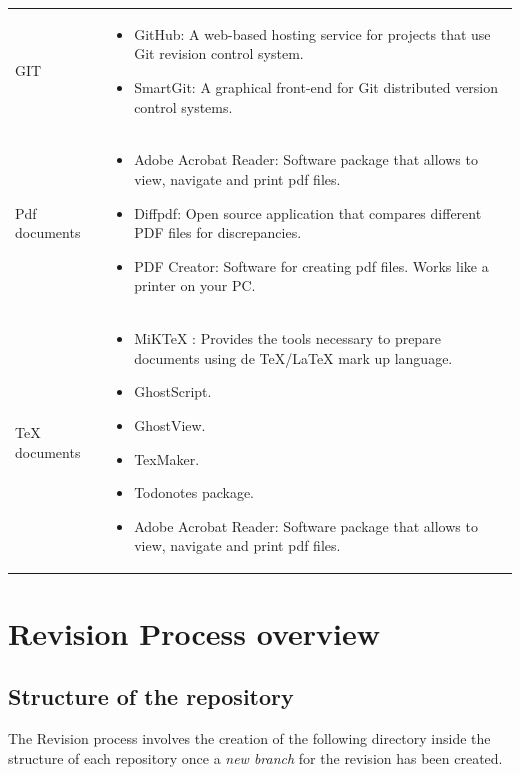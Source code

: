 \documentclass{template/openetcs_article}
\begin{document}
\begin{flushleft}

\begin{tabular}{|m{3cm}|m{11cm}|}
\hline
\rowcolor{myblue}
\multicolumn{2}{|c|}{Tools} \\\hline
GIT &
\begin{itemize}
\item GitHub: A web-based hosting service for projects that use Git revision control system.
\item SmartGit: A graphical front-end for Git distributed version control systems. 
\end{itemize}\\\hline
Pdf documents &
\begin{itemize}
\item Adobe Acrobat Reader: Software package that allows to view, navigate and print pdf files.
\item Diffpdf: Open source application that compares different PDF files for discrepancies. 
\item {PDF Creator: Software for creating pdf files. Works like a printer on your PC.}
\end{itemize}\\\hline
TeX documents &
\begin{itemize}
\item MiKTeX : Provides the tools necessary to prepare documents using de TeX/LaTeX mark up language.
\item GhostScript. 
\item GhostView.
\item TexMaker.
\item Todonotes package.
\item Adobe Acrobat Reader: Software package that allows to view, navigate and print pdf files.
\end{itemize}\\\hline
\end{tabular}
\end{flushleft}

\section{Revision Process overview}
\subsection{Structure of the repository}
 
The Revision process involves the creation of the following directory inside the structure of each repository once a {\it new branch} for the revision has been created.
\end{document}
